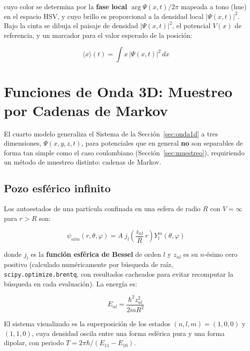 \documentclass[12pt, a4paper]{article}
\begin{document}
cuyo color se determina por la \textbf{fase local}
$\arg\Psi(x,t)/2\pi$ mapeada a tono (hue) en el espacio HSV, y cuyo
brillo es proporcional a la densidad local $|\Psi(x,t)|^2$. Bajo la
cinta se dibuja el paisaje de densidad $|\Psi(x,t)|^2$, el potencial
$V(x)$ de referencia, y un marcador para el valor esperado de la
posición:

\begin{equation}
  \langle x\rangle(t) = \int x\, |\Psi(x,t)|^2\, dx
  \label{eq:valor_esperado}
\end{equation}

\section{Funciones de Onda 3D: Muestreo por Cadenas de Markov}
\label{sec:onda3d}

El cuarto modelo generaliza el Sistema de la Sección~\ref{sec:onda1d}
a tres dimensiones, $\Psi(x,y,z,t)$, para potenciales que en general
\textbf{no} son separables de forma tan simple como el caso
coulombiano (Sección~\ref{sec:muestreo}), requiriendo un método de
muestreo distinto: cadenas de Markov.

\subsection{Pozo esférico infinito}

Los autoestados de una partícula confinada en una esfera de radio $R$
con $V=\infty$ para $r>R$ son:

\begin{equation}
  \psi_{nlm}(r,\theta,\varphi) = A\; j_l\!\left(\frac{z_{nl}}{R}\,r\right)
  Y_l^m(\theta,\varphi)
  \label{eq:pozo_esferico}
\end{equation}

donde $j_l$ es la \textbf{función esférica de Bessel} de orden $l$ y
$z_{nl}$ es su $n$-ésimo cero positivo (calculado numéricamente por
búsqueda de raíz, \texttt{scipy.optimize.brentq}, con resultados
cacheados para evitar recomputar la búsqueda en cada evaluación). La
energía es:

\begin{equation}
  E_{nl} = \frac{\hbar^2 z_{nl}^2}{2mR^2}
  \label{eq:energia_pozo_esferico}
\end{equation}

El sistema visualizado es la superposición de los estados
$(n,l,m)=(1,0,0)$ y $(1,1,0)$, cuya densidad oscila entre una forma
esférica pura y una forma dipolar, con periodo
$T=2\pi\hbar/(E_{11}-E_{10})$.
\end{document}
